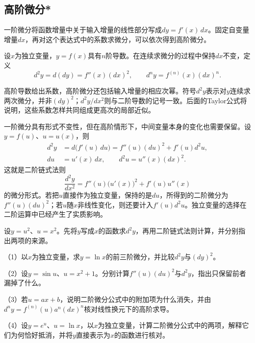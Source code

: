 \FloatBarrier
\newpage
\begingroup
\setlength{\parskip}{4pt}
\setlength{\abovedisplayskip}{10pt}
\setlength{\belowdisplayskip}{10pt}
\subsection{高阶微分*}

一阶微分将函数增量中关于输入增量的线性部分写成\(dy=f'(x)\,dx\)。固定自变量增量\(dx\)，再对这个表达式中的系数求微分，可以依次得到高阶微分。

\begin{definition}
设\(x\)为独立变量，\(y=f(x)\)具有\(n\)阶导数。在连续求微分的过程中保持\(dx\)不变，定义
\begin{equation*}
 d^2y=d(dy)=f''(x)(dx)^2,\qquad
 d^ny=f^{(n)}(x)(dx)^n.
\end{equation*}
\end{definition}

高阶导数给出系数，高阶微分还包括输入增量的相应次幂。符号\(d^2y\)表示对\(y\)连续求两次微分，并非\((dy)^2\)；\(d^2y/dx^2\)则与二阶导数的记号一致。后面的Taylor公式将说明，这些系数怎样共同组成更高次的局部近似。

一阶微分具有形式不变性，但在高阶情形下，中间变量本身的变化也需要保留。设\(y=f(u)\)、\(u=u(x)\)，则
\begin{equation*}
 \begin{aligned}
 d^2y&=d\bigl(f'(u)\,du\bigr)
       =f''(u)(du)^2+f'(u)d^2u,\\
 du&=u'(x)\,dx,\qquad d^2u=u''(x)(dx)^2.
 \end{aligned}
\end{equation*}
这就是二阶链式法则
\begin{equation*}
 \frac{d^2y}{dx^2}=f''(u)\bigl(u'(x)\bigr)^2+f'(u)u''(x)
\end{equation*}
的微分形式。若把\(u\)直接作为独立变量，保持的是\(du\)，所得到的二阶微分为\(f''(u)(du)^2\)；若\(u\)随\(x\)非线性变化，则还要计入\(f'(u)d^2u\)。独立变量的选择在二阶运算中已经产生了实质影响。

\begin{example}
设\(y=u^2\)、\(u=x^2\)。先将\(y\)写成\(x\)的函数求\(d^2y\)，再用二阶链式法则计算，并分别指出两项的来源。
\end{example}

\begin{exercise}
\mbox{}\par\nobreak

（1）以\(x\)为独立变量，求\(y=\ln x\)的前三阶微分，并比较\(d^2y\)与\((dy)^2\)。

（2）设\(y=\sin u\)、\(u=x^2+1\)。分别计算\(f''(u)(du)^2\)与\(d^2y\)，指出只保留前者漏掉了什么。

（3）若\(u=ax+b\)，说明二阶微分公式中的附加项为什么消失，并由\(d^ny=f^{(n)}(u)a^n(dx)^n\)核对线性换元下的高阶求导。

（4）设\(y=e^u\)、\(u=\ln x\)，以\(x\)为独立变量，计算二阶微分公式中的两项，解释它们为何恰好抵消，并将\(y\)直接表示为\(x\)的函数进行核对。
\end{exercise}

